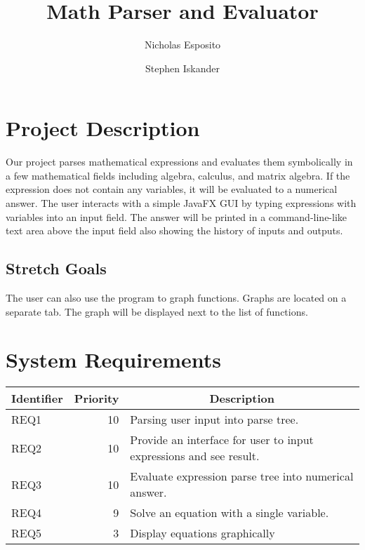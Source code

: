 \documentclass[letterpaper]{article}
\begin{document}
\title{\textbf{Math Parser and Evaluator}}
\author{Nicholas Esposito \and Stephen Iskander}

\maketitle

\section{Project Description}
Our project parses mathematical expressions and evaluates them symbolically in a few mathematical fields including algebra, calculus, and matrix algebra.
If the expression does not contain any variables, it will be evaluated to a numerical answer.
The user interacts with a simple JavaFX GUI by typing expressions with variables into an input field.
The answer will be printed in a command-line-like text area above the input field also showing the history of inputs and outputs.


\subsection{Stretch Goals}
The user can also use the program to graph functions.
Graphs are located on a separate tab.
The graph will be displayed next to the list of functions.


\section{System Requirements}

\begin{tabular}{|l|r|l|}
\hline
\multicolumn{1}{|c|}{\textbf{Identifier}} & \multicolumn{1}{c|}{\textbf{Priority}} & \multicolumn{1}{c|}{\textbf{Description}} \\ \hline
REQ1 & 10 & Parsing user input into parse tree. \\ \hline
REQ2 & 10 & Provide an interface for user to input expressions and see result.\\ \hline
REQ3 & 10 & Evaluate expression parse tree into numerical answer. \\ \hline
REQ4 & 9  & Solve an equation with a single variable. \\ \hline
REQ5 & 3  & Display equations graphically \\ \hline
\end{tabular}
\end{document}
